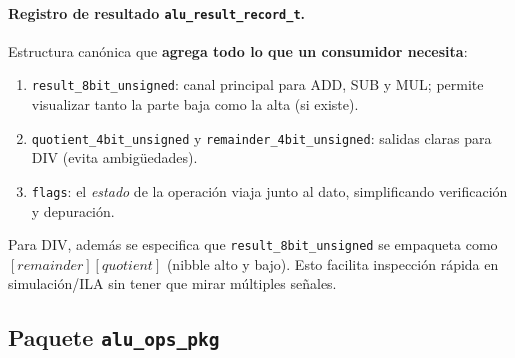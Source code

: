 \documentclass[a4paper,12pt]{article}
\begin{document}
\paragraph{Registro de resultado \texttt{alu\_result\_record\_t}.}
Estructura canónica que \textbf{agrega todo lo que un consumidor necesita}:
\begin{enumerate}
  \item \texttt{result\_8bit\_unsigned}: canal principal para ADD, SUB y MUL; permite visualizar tanto la parte baja como la alta (si existe).
  \item \texttt{quotient\_4bit\_unsigned} y \texttt{remainder\_4bit\_unsigned}: salidas claras para DIV (evita ambigüedades).
  \item \texttt{flags}: el \emph{estado} de la operación viaja junto al dato, simplificando verificación y depuración.
\end{enumerate}
Para DIV, además se especifica que \texttt{result\_8bit\_unsigned} se empaqueta como \([remainder][quotient]\) (nibble alto y bajo). Esto facilita inspección rápida en simulación/ILA sin tener que mirar múltiples señales.

\newpage

\subsection{Paquete \texttt{alu\_ops\_pkg}}
\label{subsec:alu-ops-pkg}
\end{document}
